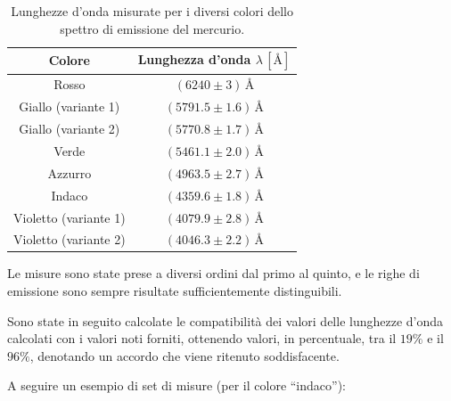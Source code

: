 \documentclass[a4paper,12pt]{article}
\begin{document}
\begin{table}[H]
    \centering
    \begin{tabular}{|c|c|}
    \hline
    \textbf{Colore} & \textbf{Lunghezza d'onda} \(\lambda \, [\text{\AA}]\) \\ 
    \hline
    Rosso & \( (6240 \pm 3) \, \text{\AA} \) \\ 
    \hline
    Giallo (variante 1) & \( (5791.5 \pm 1.6) \, \text{\AA} \) \\ 
    \hline
    Giallo (variante 2) & \( (5770.8 \pm 1.7) \, \text{\AA} \) \\ 
    \hline
    Verde & \( (5461.1 \pm 2.0) \, \text{\AA} \) \\ 
    \hline
    Azzurro & \( (4963.5 \pm 2.7) \, \text{\AA} \) \\ 
    \hline
    Indaco & \( (4359.6 \pm 1.8) \, \text{\AA} \) \\ 
    \hline
    Violetto (variante 1) & \( (4079.9 \pm 2.8) \, \text{\AA} \) \\ 
    \hline
    Violetto (variante 2) & \( (4046.3 \pm 2.2) \, \text{\AA} \) \\ 
    \hline
    \end{tabular}
    \caption{Lunghezze d'onda misurate per i diversi colori dello spettro di emissione del mercurio.}
    \end{table}
    
Le misure sono state prese a diversi ordini dal primo al quinto, e le righe di emissione sono sempre risultate sufficientemente distinguibili.

Sono state in seguito calcolate le compatibilità dei valori delle lunghezze d’onda calcolati con i valori noti forniti, ottenendo valori, in percentuale, tra il \( 19\% \) e il \( 96\% \), denotando un accordo che viene ritenuto soddisfacente.

A seguire un esempio di set di misure (per il colore “indaco”):
\end{document}
